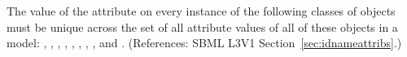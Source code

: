 The value of the attribute  on every instance of the following
classes of objects must be unique across the set of all 
attribute values of all of these objects in a model: \Model,
\FunctionDefinition, \Compartment, \Species, \Reaction, \SpeciesReference,
\ModifierSpeciesReference, \Event, and \Parameter.  (References: SBML L3V1
Section~\ref{sec:idnameattribs}.)
